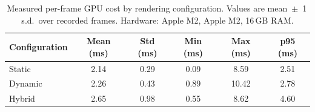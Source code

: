 \begin{table}[htbp]
  \centering
  \caption{Measured per-frame GPU cost by rendering configuration. Values are mean~$\pm$~1\,s.d.\ over recorded frames. Hardware: Apple M2, Apple M2, 16\,GB RAM.}
  \label{tab:frame-cost}
  \begin{tabular}{lccccc}
    \toprule
    \textbf{Configuration} & \textbf{Mean (ms)} & \textbf{Std (ms)} & \textbf{Min (ms)} & \textbf{Max (ms)} & \textbf{p95 (ms)} \\
    \midrule
    Static & 2.14 & 0.29 & 0.09 & 8.59 & 2.51 \\
    Dynamic & 2.26 & 0.43 & 0.89 & 10.42 & 2.78 \\
    Hybrid & 2.65 & 0.98 & 0.55 & 8.62 & 4.60 \\
    \bottomrule
  \end{tabular}
\end{table}
